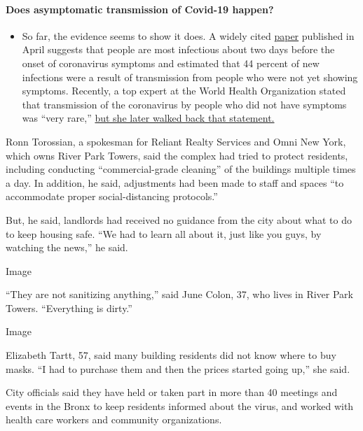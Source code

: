 \begin{itemize}
{  \paragraph{Does asymptomatic transmission of Covid-19
  happen?}\label{does-asymptomatic-transmission-of-covid-19-happen}}

  \begin{itemize}
  \tightlist
  \item
    So far, the evidence seems to show it does. A widely cited
    \href{https://www.nature.com/articles/s41591-020-0869-5}{paper}
    published in April suggests that people are most infectious about
    two days before the onset of coronavirus symptoms and estimated that
    44 percent of new infections were a result of transmission from
    people who were not yet showing symptoms. Recently, a top expert at
    the World Health Organization stated that transmission of the
    coronavirus by people who did not have symptoms was ``very rare,''
    \href{https://www.nytimes.com/2020/06/09/world/coronavirus-updates.html?action=click\&pgtype=Article\&state=default\&region=MAIN_CONTENT_3\&context=storylines_faq\#link-1f302e21}{but
    she later walked back that statement.}
  \end{itemize}
\end{itemize}

Ronn Torossian, a spokesman for Reliant Realty Services and Omni New
York, which owns River Park Towers, said the complex had tried to
protect residents, including conducting ``commercial-grade cleaning'' of
the buildings multiple times a day. In addition, he said, adjustments
had been made to staff and spaces ``to accommodate proper
social-distancing protocols.''

But, he said, landlords had received no guidance from the city about
what to do to keep housing safe. ``We had to learn all about it, just
like you guys, by watching the news,'' he said.

Image

``They are not sanitizing anything,'' said June Colon, 37, who lives in
River Park Towers. ``Everything is dirty.''

Image

Elizabeth Tartt, 57, said many building residents did not know where to
buy masks. ``I had to purchase them and then the prices started going
up,'' she said.

City officials said they have held or taken part in more than 40
meetings and events in the Bronx to keep residents informed about the
virus, and worked with health care workers and community organizations.

